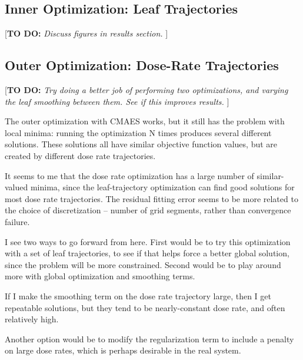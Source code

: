 \documentclass[12pt]{article}
\newcommand{\todo}[1]{{\color{lightblue}\par {[{\bf TO DO: } {\em #1}} ] \\    }}
\begin{document}
\subsection{Inner Optimization:  Leaf Trajectories}

\todo{Discuss figures in results section.}


\subsection{Outer Optimization:  Dose-Rate Trajectories}

\todo{Try doing a better job of performing two optimizations, and varying the leaf smoothing between them.
      See if this improves results.}

The outer optimization with CMAES works, but it still has the problem with local minima:
running the optimization N times produces several different solutions.
These solutions all have similar objective function values, but are created by different
dose rate trajectories.

It seems to me that the dose rate optimization has a large number of similar-valued minima,
since the leaf-trajectory optimization can find good solutions for most dose rate trajectories.
The residual fitting error seems to be more related to the choice of discretization -- number of
grid segments, rather than convergence failure.

I see two ways to go forward from here. First would be to try this optimization with a set of
leaf trajectories, to see if that helps force a better global solution, since the problem will
be more constrained. Second would be to play around more with global optimization and smoothing
terms.

If I make the smoothing term on the dose rate trajectory large, then I get repeatable solutions,
but they tend to be nearly-constant dose rate, and often relatively high.

Another option would be to modify the regularization term to include a  penalty on large
dose rates, which is perhaps desirable in the real system.





\end{document}

